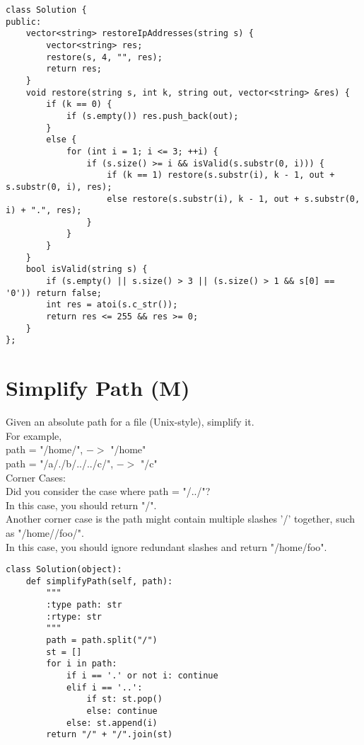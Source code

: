 \begin{lstlisting}
class Solution {
public:
    vector<string> restoreIpAddresses(string s) {
        vector<string> res;
        restore(s, 4, "", res);
        return res;
    }
    void restore(string s, int k, string out, vector<string> &res) {
        if (k == 0) {
            if (s.empty()) res.push_back(out);
        }
        else {
            for (int i = 1; i <= 3; ++i) {
                if (s.size() >= i && isValid(s.substr(0, i))) {
                    if (k == 1) restore(s.substr(i), k - 1, out + s.substr(0, i), res);
                    else restore(s.substr(i), k - 1, out + s.substr(0, i) + ".", res);
                }
            }
        }
    }
    bool isValid(string s) {
        if (s.empty() || s.size() > 3 || (s.size() > 1 && s[0] == '0')) return false;
        int res = atoi(s.c_str());
        return res <= 255 && res >= 0;
    }
};
\end{lstlisting}


\section{Simplify Path (M)}
Given an absolute path for a file (Unix-style), simplify it.\\

For example,\\
path = "/home/", $->$ "/home"\\
path = "/a/./b/../../c/", $->$ "/c"\\

Corner Cases:\\
    Did you consider the case where path = "/../"?\\
    In this case, you should return "/".\\
    Another corner case is the path might contain multiple slashes '/' together, such as "/home//foo/".\\
    In this case, you should ignore redundant slashes and return "/home/foo".\\

\begin{lstlisting}
class Solution(object):
    def simplifyPath(self, path):
        """
        :type path: str
        :rtype: str
        """
        path = path.split("/")
        st = []
        for i in path:
            if i == '.' or not i: continue
            elif i == '..':
                if st: st.pop()
                else: continue
            else: st.append(i)
        return "/" + "/".join(st)
\end{lstlisting}
            
